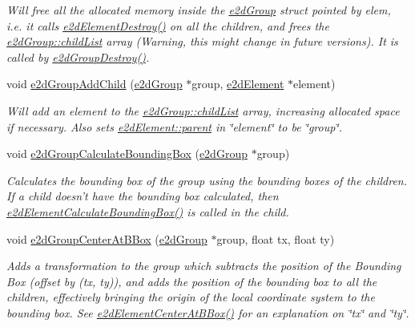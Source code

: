 \begin{DoxyCompactItemize}
\begin{DoxyCompactList}\small\item\em Will free all the allocated memory inside the \hyperlink{structe2d_group}{e2d\-Group} struct pointed by elem, i.\-e. it calls \hyperlink{group__e2d_element_ga214c437a16fe6f3fc795539f851a2019}{e2d\-Element\-Destroy()} on all the children, and frees the \hyperlink{structe2d_group_a55f6dde874716dc99dcd270fc0999a01}{e2d\-Group\-::child\-List} array (Warning, this might change in future versions). It is called by \hyperlink{group__e2d_group_ga545626effa0f89b72f244e56aadb05bc}{e2d\-Group\-Destroy()}. \end{DoxyCompactList}\item 
void \hyperlink{group__e2d_group_ga6ae76730f78ad731621e9286a3980b8a}{e2d\-Group\-Add\-Child} (\hyperlink{structe2d_group}{e2d\-Group} $\ast$group, \hyperlink{structe2d_element}{e2d\-Element} $\ast$element)
\begin{DoxyCompactList}\small\item\em Will add an element to the \hyperlink{structe2d_group_a55f6dde874716dc99dcd270fc0999a01}{e2d\-Group\-::child\-List} array, increasing allocated space if necessary. Also sets \hyperlink{structe2d_element_a3e62eb2fbf1d6bc6d6fe549096a6cee9}{e2d\-Element\-::parent} in \char`\"{}element\char`\"{} to be \char`\"{}group\char`\"{}. \end{DoxyCompactList}\item 
void \hyperlink{group__e2d_group_ga7c5f43489bbd2d36a51414aee07abf5a}{e2d\-Group\-Calculate\-Bounding\-Box} (\hyperlink{structe2d_group}{e2d\-Group} $\ast$group)
\begin{DoxyCompactList}\small\item\em Calculates the bounding box of the group using the bounding boxes of the children. If a child doesn't have the bounding box calculated, then \hyperlink{group__e2d_element_ga94aa710b2da71af2091fe4d5b87ce47e}{e2d\-Element\-Calculate\-Bounding\-Box()} is called in the child. \end{DoxyCompactList}\item 
void \hyperlink{group__e2d_group_ga04bf94419865ca7f9d6daf30ce3fadf0}{e2d\-Group\-Center\-At\-B\-Box} (\hyperlink{structe2d_group}{e2d\-Group} $\ast$group, float tx, float ty)
\begin{DoxyCompactList}\small\item\em Adds a transformation to the group which subtracts the position of the Bounding Box (offset by (tx, ty)), and adds the position of the bounding box to all the children, effectively bringing the origin of the local coordinate system to the bounding box. See \hyperlink{group__e2d_element_ga36b01a888c97163c990e16d348aff61c}{e2d\-Element\-Center\-At\-B\-Box()} for an explanation on \char`\"{}tx\char`\"{} and \char`\"{}ty\char`\"{}. \end{DoxyCompactList}\item 

\end{DoxyCompactItemize}
